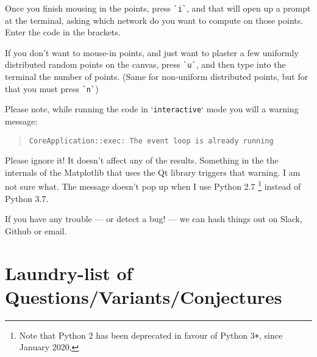 \begin{appendices}
Once you finish mousing in the points, press \verb|`i`|, and that will open up a prompt at the terminal, asking which 
network do you want to compute on those points. Enter the code in the brackets. 

If you don't want to mouse-in points, and just want to plaster a few uniformly distributed random points on the canvas, 
press \verb|`u`|, and then type into the terminal the number of points. (Same for non-uniform distributed points, but for that
you must press \verb|`n`|)

Please note, while  running the  code in `\verb|interactive|` mode you will a
warning message:

\begin{quote}
\color{blue}
\verb|CoreApplication::exec: The event loop is already running|
\end{quote}

Please ignore it! It doesn't affect any of the results. Something in the
the internals of the Matplotlib that uses the Qt library triggers that warning. I 
am not sure what. The message doesn't pop up
when I use Python 2.7 \footnote{Note that Python 2 has been deprecated in favour of Python 3\texttt{+}, since January 2020, } 
instead of Python 3.7. 

If you have any trouble --- or detect a bug! ---  we can hash things out on Slack, Github or email.

\section{Laundry-list of Questions/Variants/Conjectures}
\end{appendices}